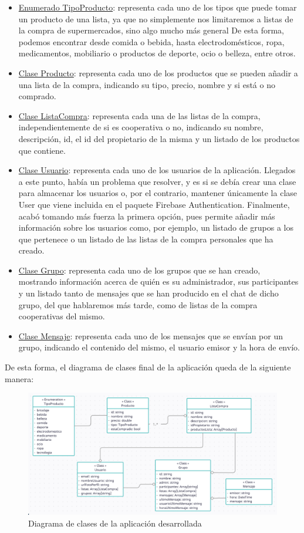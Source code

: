 \documentclass{article}
\begin{document}
\begin{itemize}
    \item \underline{Enumerado TipoProducto}: representa cada uno de los tipos que puede tomar un producto de una lista, ya que no simplemente nos limitaremos a listas de la compra de supermercados, sino algo mucho más general De esta forma, podemos encontrar desde comida o bebida, hasta electrodomésticos, ropa, medicamentos, mobiliario o productos de deporte, ocio o belleza, entre otros.
    \item \underline{Clase Producto}: representa cada uno de los productos que se pueden añadir a una lista de la compra, indicando su tipo, precio, nombre y si está o no comprado.
    \item \underline{Clase ListaCompra}: representa cada una de las listas de la compra, independientemente de si es cooperativa o no, indicando su nombre, descripción, id, el id del propietario de la misma y un listado de los productos que contiene.
    \item \underline{Clase Usuario}: representa cada uno de los usuarios de la aplicación. Llegados a este punto, había un problema que resolver, y es si se debía crear una clase para almacenar los usuarios o, por el contrario, mantener únicamente la clase User que viene incluida en el paquete Firebase Authentication. Finalmente, acabó tomando más fuerza la primera opción, pues permite añadir más información sobre los usuarios como, por ejemplo, un listado de grupos a los que pertenece o un listado de las listas de la compra personales que ha creado.
    \item \underline{Clase Grupo}: representa cada uno de los grupos que se han creado, mostrando información acerca de quién es su administrador, sus participantes y un listado tanto de mensajes que se han producido en el chat de dicho grupo, del que hablaremos más tarde, como de listas de la compra cooperativas del mismo.
    \item \underline{Clase Mensaje}: representa cada uno de los mensajes que se envían por un grupo, indicando el contenido del mismo, el usuario emisor y la hora de envío.
\end{itemize}

De esta forma, el diagrama de clases final de la aplicación queda de la siguiente manera:

\begin{figure}[h]
    \centering
    \includegraphics[width=1\textwidth]{imagenes/diagrama_clases.png}
    \caption{Diagrama de clases de la aplicación desarrollada}
\end{figure}
\end{document}
